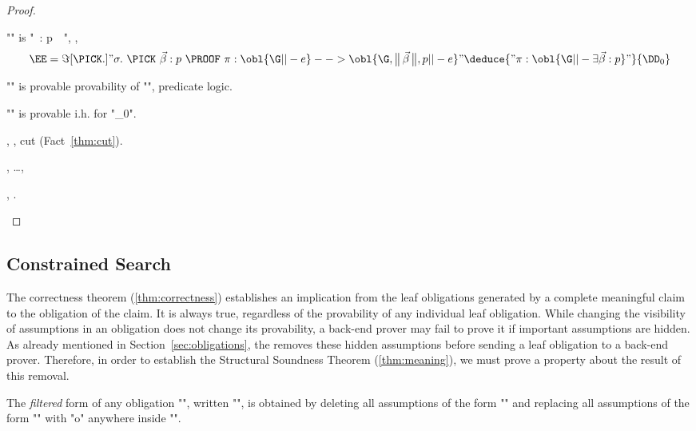 \documentclass[a4paper]{easychair}
\begin{document}
\begin{proof}
\begin{ecom}[{$\s1$}1.]
\begin{ecom}[{$\s2$}1.]
    \item \Case "\tau" is "\PICK\ \vec\beta : p\ \PROOF\ \pi", \ie,
      \begin{gather*}
        \EE =
        \Im[\PICK.]{"\sigma.\ \PICK\ \vec\beta : p\ \PROOF\ \pi :
                        \obl{\G ||- e} --> \obl{\G, \refl{\vec \beta}, p ||- e}"}
           {\deduce{"\pi : \obl{\G ||- \exists \vec \beta : p}"}{\DD_0}}
      \end{gather*}

      \begin{ecom}[{$\s3$}1.]
      \item "" is provable
\by provability of "", predicate logic.
      \item "" is provable
\by i.h. for "\DD_0".
      \item \Qed
\by {}, , cut (Fact~\ref{thm:cut}).
      \end{ecom}

    \item \Qed
\by {}, \dots, 
    \end{ecom}
  \item \Qed
\by {}, .
  \end{ecom}
\end{proof}

\subsection{Constrained Search}
\label{apx:constraints}

The correctness theorem (\ref{thm:correctness}) establishes an
implication from the leaf obligations generated by a complete
meaningful claim to the obligation of the claim. It is always true,
regardless of the provability of any individual leaf obligation. While
changing the visibility of assumptions in an obligation does not
change its provability, a back-end prover may fail to prove it if
important assumptions are hidden.  As already mentioned in
Section~\ref{sec:obligations}, the \PM removes these hidden
assumptions before sending a leaf obligation to a back-end prover.
Therefore, in order to establish the Structural Soundness Theorem
(\ref{thm:meaning}), we must prove a property about the result of this
removal.

\begin{defn}[Filtration] \label{defn:filter} 
The \emph{filtered} form of any obligation "\phi", written
  "\filter\phi", is obtained by deleting all assumptions of the form
  "" and replacing all assumptions of the form "" with "\NEW o" anywhere inside "\phi".
\end{defn}
\end{document}
